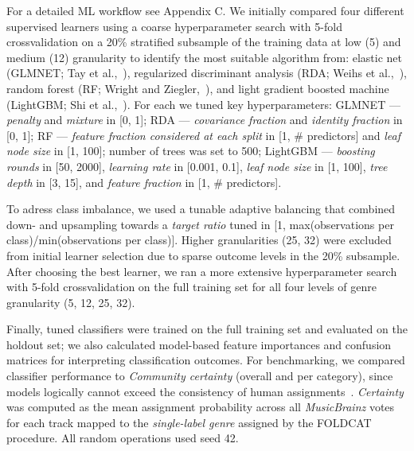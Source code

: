 \documentclass{article}
\begin{document}
For a detailed ML workflow see Appendix C. We initially compared four different supervised learners using a coarse hyperparameter search with 5-fold crossvalidation on a 20\% stratified subsample of the training data at low (5) and medium (12) granularity to identify the most suitable algorithm from: elastic net (GLMNET; Tay et al.,~\citeyear{tayetalElasticNet2023}), regularized discriminant analysis (RDA; Weihs et al.,~\citeyear{weihsetalKlaR2005}), random forest (RF; Wright and Ziegler,~\citeyear{wrightetalRanger2017}), and light gradient boosted machine (LightGBM; Shi et al.,~\citeyear{shietalLightgbm2025}). For each we tuned key hyperparameters: GLMNET — \textit{penalty} and \textit{mixture} in [0, 1]; RDA — \textit{covariance fraction} and \textit{identity fraction} in [0, 1]; RF — \textit{feature fraction considered at each split} in [1, \# predictors] and \textit{leaf node size} in [1, 100]; number of trees was set to 500; LightGBM — \textit{boosting rounds} in [50, 2000], \textit{learning rate} in [0.001, 0.1], \textit{leaf node size} in [1, 100], \textit{tree depth} in [3, 15], and \textit{feature fraction} in [1, \# predictors]. 

To adress class imbalance, we used a tunable adaptive balancing that combined down- and upsampling towards a \textit{target ratio} tuned in [1, max(observations per class)/min(observations per class)]. Higher granularities (25, 32) were excluded from initial learner selection due to sparse outcome levels in the 20\% subsample. After choosing the best learner, we ran a more extensive hyperparameter search with 5-fold crossvalidation on the full training set for all four levels of genre granularity (5, 12, 25, 32).

Finally, tuned classifiers were trained on the full training set and evaluated on the holdout set; we also calculated model-based feature importances and  confusion matrices for interpreting classification outcomes. For benchmarking, we compared classifier performance to \textit{Community certainty} (overall and per category), since models logically cannot exceed the consistency of human assignments~\citep{sturmReviewValidityIts2023}. \textit{Certainty} was computed as the mean assignment probability across all \textit{MusicBrainz} votes for each track mapped to the \textit{single-label genre} assigned by the FOLDCAT procedure. All random operations used seed 42.
\end{document}
